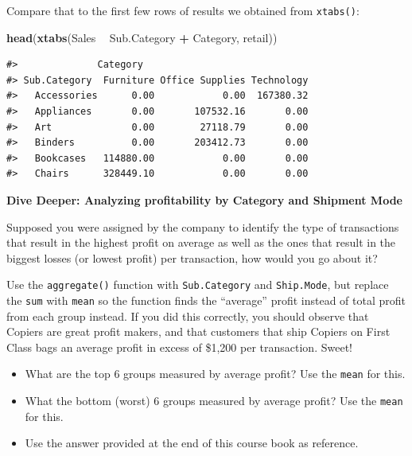 \documentclass[]{article}
\newenvironment{Shaded}{\begin{snugshade}}{\end{snugshade}}
\newcommand{\KeywordTok}[1]{\textcolor[rgb]{0.13,0.29,0.53}{\textbf{#1}}}
\newcommand{\NormalTok}[1]{#1}
\newcommand{\OperatorTok}[1]{\textcolor[rgb]{0.81,0.36,0.00}{\textbf{#1}}}
\newcommand{\StringTok}[1]{\textcolor[rgb]{0.31,0.60,0.02}{#1}}
\providecommand{\tightlist}{%
  \setlength{\itemsep}{0pt}\setlength{\parskip}{0pt}}
\begin{document}
Compare that to the first few rows of results we obtained from
\texttt{xtabs()}:

\begin{Shaded}
\begin{Highlighting}[]
\KeywordTok{head}\NormalTok{(}\KeywordTok{xtabs}\NormalTok{(Sales }\OperatorTok{~}\StringTok{ }\NormalTok{Sub.Category }\OperatorTok{+}\StringTok{ }\NormalTok{Category, retail))}
\end{Highlighting}
\end{Shaded}

\begin{verbatim}
#>              Category
#> Sub.Category  Furniture Office Supplies Technology
#>   Accessories      0.00            0.00  167380.32
#>   Appliances       0.00       107532.16       0.00
#>   Art              0.00        27118.79       0.00
#>   Binders          0.00       203412.73       0.00
#>   Bookcases   114880.00            0.00       0.00
#>   Chairs      328449.10            0.00       0.00
\end{verbatim}

\textbf{Dive Deeper: Analyzing profitability by Category and Shipment
Mode}

Supposed you were assigned by the company to identify the type of
transactions that result in the highest profit on average as well as the
ones that result in the biggest losses (or lowest profit) per
transaction, how would you go about it?

Use the \texttt{aggregate()} function with \texttt{Sub.Category} and
\texttt{Ship.Mode}, but replace the \texttt{sum} with \texttt{mean} so
the function finds the ``average'' profit instead of total profit from
each group instead. If you did this correctly, you should observe that
Copiers are great profit makers, and that customers that ship Copiers on
First Class bags an average profit in excess of \$1,200 per transaction.
Sweet!

\begin{itemize}
\tightlist
\item
  What are the top 6 groups measured by average profit? Use the
  \texttt{mean} for this.\\
\item
  What the bottom (worst) 6 groups measured by average profit? Use the
  \texttt{mean} for this.\\
\item
  Use the answer provided at the end of this course book as reference.
\end{itemize}
\end{document}
